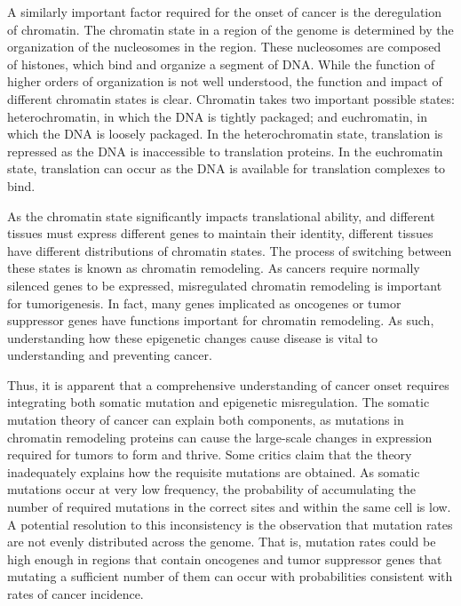 A similarly important factor required for the onset of cancer is the deregulation of chromatin.
The chromatin state in a region of the genome is determined by the organization of the nucleosomes in the region.
These nucleosomes are composed of histones, which bind and organize a segment of DNA.
While the function of higher orders of organization is not well understood, the function and impact of different chromatin states is clear.
Chromatin takes two important possible states: heterochromatin, in which the DNA is tightly packaged; and euchromatin, in which the DNA is loosely packaged.
In the heterochromatin state, translation is repressed as the DNA is inaccessible to translation proteins.
In the euchromatin state, translation can occur as the DNA is available for translation complexes to bind.

As the chromatin state significantly impacts translational ability, and different tissues must express different genes to maintain their identity, different tissues have different distributions of chromatin states.
The process of switching between these states is known as chromatin remodeling.
As cancers require normally silenced genes to be expressed, misregulated chromatin remodeling is important for tumorigenesis.
In fact, many genes implicated as oncogenes or tumor suppressor genes have functions important for chromatin remodeling.
As such, understanding how these epigenetic changes cause disease is vital to understanding and preventing cancer.


Thus, it is apparent that a comprehensive understanding of cancer onset requires integrating both somatic mutation and epigenetic misregulation.
The somatic mutation theory of cancer can explain both components, as mutations in chromatin remodeling proteins can cause the large-scale changes in expression required for tumors to form and thrive.
Some critics claim that the theory inadequately explains how the requisite mutations are obtained.
As somatic mutations occur at very low frequency, the probability of accumulating the number of required mutations in the correct sites and within the same cell is low.
A potential resolution to this inconsistency is the observation that mutation rates are not evenly distributed across the genome.
That is, mutation rates could be high enough in regions that contain oncogenes and tumor suppressor genes that mutating a sufficient number of them can occur with probabilities consistent with rates of cancer incidence.

